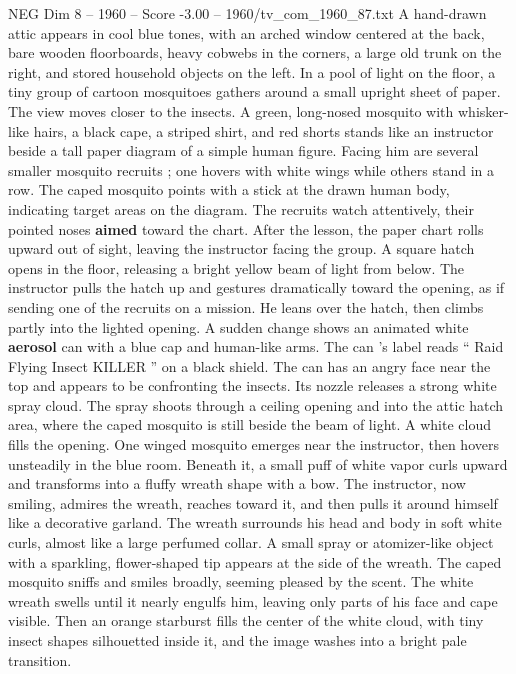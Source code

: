 \begin{textsample}{NEG Dim 8 – 1960 – Score -3.00 – 1960/tv\_com\_1960\_87.txt}  \label{ex:f8_neg_007}
A hand-drawn attic appears in cool blue tones, with an arched window centered at the back, bare wooden floorboards, heavy cobwebs in the corners, a large old trunk on the right, and stored household objects on the left.
In a pool of light on the floor, a tiny group of cartoon mosquitoes gathers around a small upright sheet of paper.
The view moves closer to the insects.
A green, long-nosed mosquito with whisker-like hairs, a black cape, a striped shirt, and red shorts stands like an instructor beside a tall paper diagram of a simple human figure.
Facing him are several smaller mosquito recruits ; one hovers with white wings while others stand in a row.
The caped mosquito points with a stick at the drawn human body, indicating target areas on the diagram.
The recruits watch attentively, their pointed noses \textbf{aimed} toward the chart.
After the lesson, the paper chart rolls upward out of sight, leaving the instructor facing the group.
A square hatch opens in the floor, releasing a bright yellow beam of light from below.
The instructor pulls the hatch up and gestures dramatically toward the opening, as if sending one of the recruits on a mission.
He leans over the hatch, then climbs partly into the lighted opening.
A sudden change shows an animated white \textbf{aerosol} can with a blue cap and human-like arms.
The can ’s label reads “ Raid Flying Insect KILLER ” on a black shield.
The can has an angry face near the top and appears to be confronting the insects.
Its nozzle releases a strong white spray cloud.
The spray shoots through a ceiling opening and into the attic hatch area, where the caped mosquito is still beside the beam of light.
A white cloud fills the opening.
One winged mosquito emerges near the instructor, then hovers unsteadily in the blue room.
Beneath it, a small puff of white vapor curls upward and transforms into a fluffy wreath shape with a bow.
The instructor, now smiling, admires the wreath, reaches toward it, and then pulls it around himself like a decorative garland.
The wreath surrounds his head and body in soft white curls, almost like a large perfumed collar.
A small spray or atomizer-like object with a sparkling, flower-shaped tip appears at the side of the wreath.
The caped mosquito sniffs and smiles broadly, seeming pleased by the scent.
The white wreath swells until it nearly engulfs him, leaving only parts of his face and cape visible.
Then an orange starburst fills the center of the white cloud, with tiny insect shapes silhouetted inside it, and the image washes into a bright pale transition.

\end{textsample}
